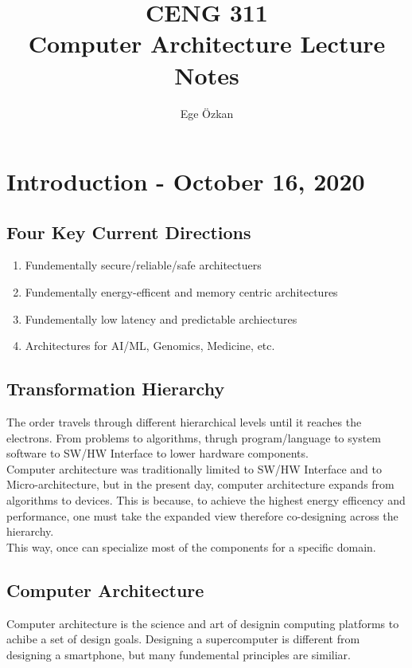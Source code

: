 \documentclass[11pt,a4paper,twocolumn]{book}
\author{Ege Özkan}
\title{CENG 311 \\ \large{Computer Architecture Lecture Notes}}
\begin{document}
\maketitle

\chapter{Introduction - October 16, 2020}

\section{Four Key Current Directions}

\begin{enumerate}
\item Fundementally secure/reliable/safe architectuers
\item Fundementally energy-efficent and memory centric architectures
\item Fundementally low latency and predictable archiectures
\item Architectures for AI/ML, Genomics, Medicine, etc.
\end{enumerate}

\section{Transformation Hierarchy}

The order travels through different hierarchical levels until it reaches the electrons. From problems to algorithms, thrugh program/language to system software to SW/HW Interface to lower hardware components.\\

Computer architecture was traditionally limited to SW/HW Interface and to Micro-architecture, but in the present day, computer architecture expands from algorithms to devices. This is because, to achieve the highest energy efficency and performance, one must take the expanded view therefore co-designing across the hierarchy.\\

This way, once can specialize most of the components for a specific domain.

\section{Computer Architecture}

Computer architecture is the science and art of designin computing platforms to achibe a set of design goals. Designing a supercomputer is different from designing a smartphone, but many fundemental principles are similiar.\\
\end{document}
